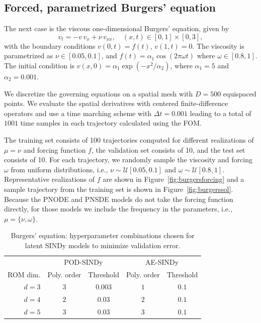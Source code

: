 \documentclass{article}
\begin{document}
	\subsection{Forced, parametrized Burgers' equation} \label{sec:burgersdetails}
	The next case is the viscous one-dimensional Burgers' equation, given by
	\begin{equation*}
		v_t = -v\, v_x + \nu\, v_{xx},\quad (x,t) \in [0,1] \times [0,3],
	\end{equation*}
	with the boundary conditions $v(0,t) = f(t)$, $v(1,t) = 0$. The viscosity is parametrized as $\nu \in [0.05,0.1]$, and $f(t) = \alpha_1 \cos(2\pi\omega t)$ where $\omega \in [0.8, 1]$. The initial condition is
	$v(x, 0) = \alpha_1 \exp (-x^2/\alpha_2)$, where $\alpha_1 =5$ and $\alpha_2 = 0.001$.
	
	We discretize the governing equations on a spatial mesh with $D=500$ equispaced points. We evaluate the spatial derivatives with centered finite-difference operators and use a time marching scheme with $\Delta t = 0.001$ leading to a total of $1001$ time samples in each trajectory calculated using the FOM.	
	
	The training set consists of 100 trajectories computed for different realizations of $\mu = \nu$ and forcing function $f$, the validation set consists of 10, and the test set consists of 10. For each trajectory, we randomly sample the viscosity and forcing $\omega$ from uniform distributions, i.e., $\nu \sim \mathcal{U}[0.05, 0.1]$ and $\omega \sim \mathcal{U}[0.8, 1]$. Representative realizations of $f$ are shown in Figure~\ref{fig:burgersforcing} and a sample trajectory from the training set is shown in Figure~\ref{fig:burgerssol}. Because the PNODE and PNSDE models do not take the forcing function directly, for those models we include the frequency in the parameters, i.e., $\mu = \{\nu, \omega\}$.
	
	\begin{table}
		\centering
		\caption{Burgers' equation: hyperparameter combinations chosen for latent SINDy models to minimize validation error.}
		\label{tab:burgers_sindyhyp}
		\begin{tabular}{r|cc|cc}
			\toprule
			& \multicolumn{2}{c}{POD-SINDy} & \multicolumn{2}{c}{AE-SINDy} \\
			ROM dim. & Poly. order & Threshold & Poly. order & Threshold \\
			\midrule
			$d=3$ & $3$ & $0.003$ & $1$ & $0.1$ \\
			$d=4$ & $2$ & $0.03$ & $2$ & $0.1$ \\
			$d=5$ & $3$ & $0.03$ & $3$ & $0.1$ \\
			\bottomrule
		\end{tabular}
	\end{table}
	
\end{document}
